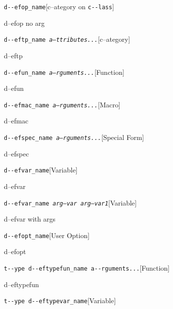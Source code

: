 \documentclass{book}
\begin{document}
\begin{titlepage}
\noindent\texttt{d{-}{-}efop\_name}\hfill[c--ategory on \texttt{c{-}{-}lass}]



%
d--efop no arg

\noindent\texttt{d{-}{-}eftp\_name \EmbracOn{}\textnormal{\textsl{a--ttributes...}}\EmbracOff{}}\hfill[c--ategory]



%
d--eftp

\noindent\texttt{d{-}{-}efun\_name \EmbracOn{}\textnormal{\textsl{a--rguments...}}\EmbracOff{}}\hfill[Function]



%
d--efun

\noindent\texttt{d{-}{-}efmac\_name \EmbracOn{}\textnormal{\textsl{a--rguments...}}\EmbracOff{}}\hfill[Macro]



%
d--efmac

\noindent\texttt{d{-}{-}efspec\_name \EmbracOn{}\textnormal{\textsl{a--rguments...}}\EmbracOff{}}\hfill[Special Form]



%
d--efspec

\noindent\texttt{d{-}{-}efvar\_name}\hfill[Variable]



%
d--efvar

\noindent\texttt{d{-}{-}efvar\_name \EmbracOn{}\textnormal{\textsl{arg--var arg--var1}}\EmbracOff{}}\hfill[Variable]



%
d--efvar with args

\noindent\texttt{d{-}{-}efopt\_name}\hfill[User Option]



%
d--efopt

\noindent\texttt{t{-}{-}ype d{-}{-}eftypefun\_name a{-}{-}rguments...}\hfill[Function]



%
d--eftypefun

\noindent\texttt{t{-}{-}ype d{-}{-}eftypevar\_name}\hfill[Variable]




\end{titlepage}
\end{document}
